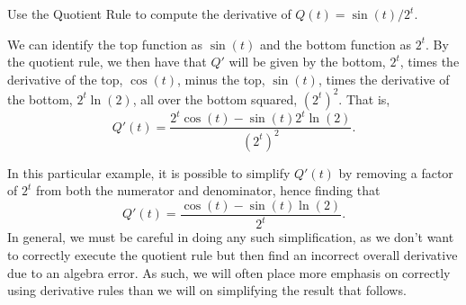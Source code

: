 \begin{example} \label{Ex:2.5.Eg4}
Use the Quotient Rule to compute the derivative of $Q(t) = \sin(t)/2^t$. 

\solution We can identify the top function as $\sin(t)$ and the bottom function as $2^t$.  By the quotient rule, we then have that $Q'$ will be given by the bottom, $2^t$, times the derivative of the top, $\cos(t)$, minus the top, $\sin(t)$, times the derivative of the bottom, $2^t \ln(2)$, all over the bottom squared, $(2^t)^2$.  That is,
\[ Q'(t) = \frac{2^t \cos(t) - \sin(t) 2^t \ln(2)}{(2^t)^2}.\]

In this particular example, it is possible to simplify $Q'(t)$ by removing a factor of $2^t$ from both the numerator and denominator, hence finding that
\[ Q'(t) = \frac{\cos(t) - \sin(t) \ln(2)}{2^t}. \]
In general, we must be careful in doing any such simplification, as we don't want to correctly execute the quotient rule but then find an incorrect overall derivative due to an algebra error.  As such, we will often place more emphasis on correctly using derivative rules than we will on simplifying the result that follows.
\end{example}
